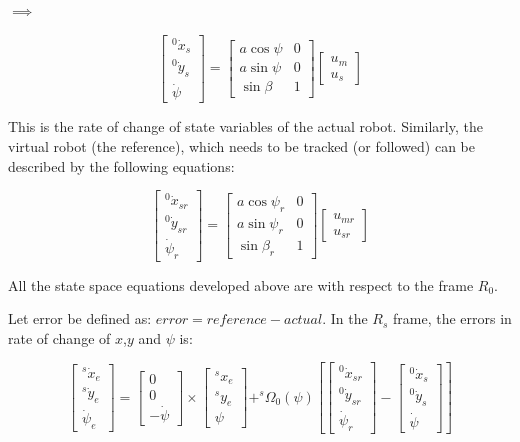 \documentclass{article}
\begin{document}
$\implies$

\[\begin{bmatrix}
^{0}\dot{x}_{s}\\
^{0}\dot{y}_{s}\\
\dot{\psi}\end{bmatrix}=\begin{bmatrix}
a\cos \psi & 0\\
a\sin \psi & 0\\
\sin \beta & 1
 \end{bmatrix} \begin{bmatrix} u_m \\ u_s \end{bmatrix} \]
 
 This is the rate of change of state variables of the actual robot. Similarly, the virtual robot (the reference), which needs to be tracked (or followed) can be described by the following equations:
 
 \[\begin{bmatrix}
^{0}\dot{x}_{sr}\\
^{0}\dot{y}_{sr}\\
\dot{\psi}_{r}\end{bmatrix}=\begin{bmatrix}
a\cos \psi_{r} & 0\\
a\sin \psi_{r} & 0\\
\sin \beta_{r} & 1
 \end{bmatrix} \begin{bmatrix} u_{mr} \\ u_{sr} \end{bmatrix} \]
 
All the state space equations developed above are with respect to the frame $R_0$.

Let error be defined as: $error=reference-actual$. In the $R_s$ frame, the errors in rate of change of $x$,$y$ and $\psi$ is:

\[\begin{bmatrix}
^{s}\dot{x}_{e}\\
^{s}\dot{y}_{e}\\
 \dot{\psi}_{e}\end{bmatrix}=\begin{bmatrix}
0\\
0\\
-\dot{\psi}
 \end{bmatrix} \times \begin{bmatrix} ^{s}x_{e}\\^{s}y_{e}\\\psi \end{bmatrix} + ^{s}\Omega_{0} (\psi)  \left[\begin{bmatrix} ^{0}\dot{x}_{sr}\\^{0}\dot{y}_{sr}\\ \dot{\psi}_{r} \end{bmatrix}-\begin{bmatrix} ^{0}\dot{x}_{s}\\^{0}\dot{y}_{s}\\ \dot{\psi} \end{bmatrix}\right]  \] 
 
\end{document}
